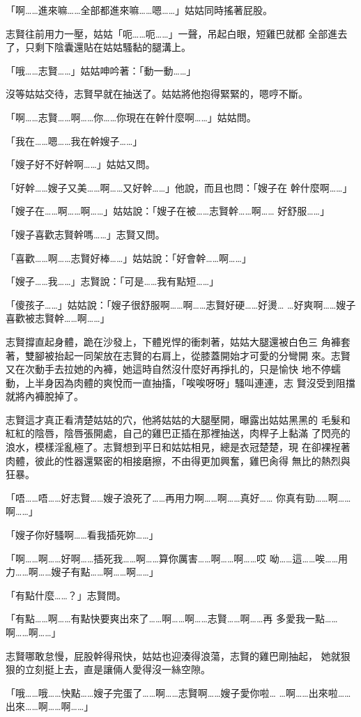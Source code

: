「啊……進來嘛……全部都進來嘛……嗯……」姑姑同時搖著屁股。

志賢往前用力一壓，姑姑「呃……呃……」一聲，吊起白眼，短雞巴就都
全部進去了，只剩下陰囊還貼在姑姑騷黏的腿溝上。

「哦……志賢……」姑姑呻吟著：「動一動……」

沒等姑姑交待，志賢早就在抽送了。姑姑將他抱得緊緊的，嗯哼不斷。

「啊……志賢……啊……你……你現在在幹什麼啊……」姑姑問。

「我在……嗯……我在幹嫂子……」

「嫂子好不好幹啊……」姑姑又問。

「好幹……嫂子又美……啊……又好幹……」他說，而且也問：「嫂子在
幹什麼啊……」

「嫂子在……啊……啊……」姑姑說：「嫂子在被……志賢幹……啊……
好舒服……」

「嫂子喜歡志賢幹嗎……」志賢又問。

「喜歡……啊……志賢好棒……」姑姑說：「好會幹……啊……」

「嫂子……我……」志賢說：「可是……我有點短……」

「傻孩子……」姑姑說：「嫂子很舒服啊……啊……志賢好硬……好燙…
…好爽啊……嫂子喜歡被志賢幹……啊……」

志賢撐直起身體，跪在沙發上，下體兇悍的衝刺著，姑姑大腿還被白色三
角褲套著，雙腳被抬起一同架放在志賢的右肩上，從膝蓋開始才可愛的分彎開
來。志賢又在次動手去拉她的內褲，她這時自然沒什麼好再掙扎的，只是愉快
地不停蠕動，上半身因為肉體的爽悅而一直抽搐，「唉唉呀呀」騷叫連連，志
賢沒受到阻擋就將內褲脫掉了。

志賢這才真正看清楚姑姑的穴，他將姑姑的大腿壓開，曝露出姑姑黑黑的
毛髮和紅紅的陰唇，陰唇張開處，自己的雞巴正插在那裡抽送，肉桿子上黏滿
了閃亮的浪水，模樣淫亂極了。志賢想到平日和姑姑相見，總是衣冠楚楚，現
在卻裸裎著肉體，彼此的性器還緊密的相接磨擦，不由得更加興奮，雞巴肏得
無比的熱烈與狂暴。

「唔……唔……好志賢……嫂子浪死了……再用力啊……啊……真好……
你真有勁……啊……啊……」

「嫂子你好騷啊……看我插死妳……」

「啊……啊……好啊……插死我……啊……算你厲害……啊……啊……哎
呦……這……唉……用力……啊……嫂子有點……啊……啊……」

「有點什麼……？」志賢問。

「有點……啊……有點快要爽出來了……啊……啊……志賢……啊……再
多愛我一點……啊……啊……」

志賢哪敢怠慢，屁股幹得飛快，姑姑也迎湊得浪蕩，志賢的雞巴剛抽起，
她就狠狠的立刻挺上去，直是讓倆人愛得沒一絲空隙。

「哦……哦……快點……嫂子完蛋了……啊……志賢啊……嫂子愛你啦…
…啊……出來啦……出來……啊……啊……」

